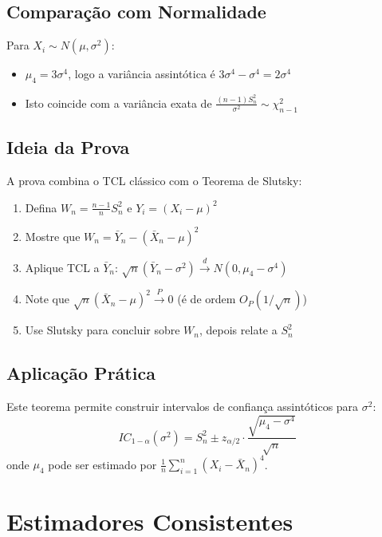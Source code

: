 \documentclass[12pt,a4paper]{article}
\theoremstyle{definition}
\theoremstyle{plain}
\begin{document}
\subsection{Comparação com Normalidade}

Para $X_i \sim N(\mu, \sigma^2)$:
\begin{itemize}
    \item $\mu_4 = 3\sigma^4$, logo a variância assintótica é $3\sigma^4 - \sigma^4 = 2\sigma^4$
    \item Isto coincide com a variância exata de $\frac{(n-1)S_n^2}{\sigma^2} \sim \chi^2_{n-1}$
\end{itemize}

\subsection{Ideia da Prova}

A prova combina o TCL clássico com o Teorema de Slutsky:

\begin{enumerate}
    \item Defina $W_n = \frac{n-1}{n}S_n^2$ e $Y_i = (X_i - \mu)^2$
    
    \item Mostre que $W_n = \bar{Y}_n - (\bar{X}_n - \mu)^2$
    
    \item Aplique TCL a $\bar{Y}_n$: $\sqrt{n}(\bar{Y}_n - \sigma^2) \xrightarrow{d} N(0, \mu_4 - \sigma^4)$
    
    \item Note que $\sqrt{n}(\bar{X}_n - \mu)^2 \xrightarrow{P} 0$ (é de ordem $O_P(1/\sqrt{n})$)
    
    \item Use Slutsky para concluir sobre $W_n$, depois relate a $S_n^2$
\end{enumerate}

\subsection{Aplicação Prática}

Este teorema permite construir intervalos de confiança assintóticos para $\sigma^2$:
\[
IC_{1-\alpha}(\sigma^2) = S_n^2 \pm z_{\alpha/2} \cdot \frac{\sqrt{\mu_4 - \sigma^4}}{\sqrt{n}}
\]
onde $\mu_4$ pode ser estimado por $\frac{1}{n}\sum_{i=1}^n (X_i - \bar{X}_n)^4$.

\section{Estimadores Consistentes}
\end{document}
